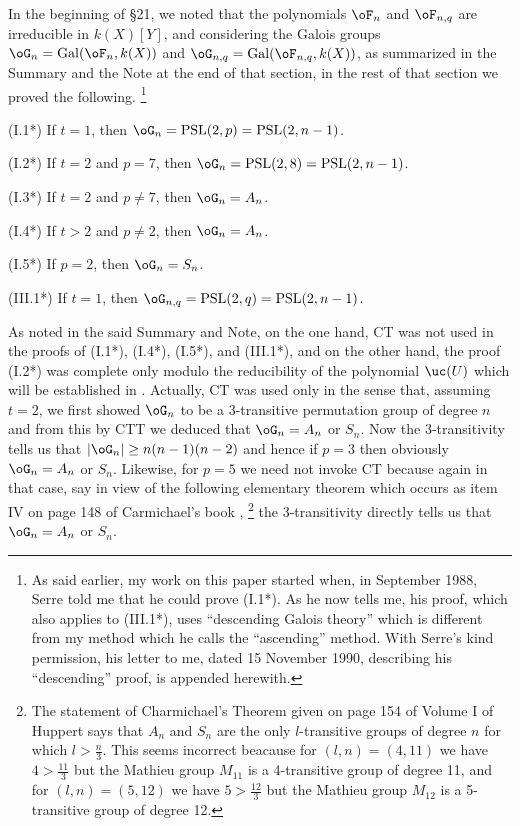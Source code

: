 In the beginning of \S21, we noted that
the polynomials $\oF_{n}$ and $\oF_{n,q}$ are irreducible 
in $k(X)[Y]$, and
considering the Galois groups 
$\oG_{n}=\operatorname{Gal}(\oF_{n},k(X))$ and
$\oG_{n,q} =\operatorname{Gal}(\oF_{n,q},k(X))$, as 
summarized in the Summary and the 
Note at the end of that section, in the rest of that 
section we 
proved the following.
\footnote{As said earlier, my work on this paper started 
when, in September
1988, Serre told me that he could prove (I.1*). As he now 
tells me, his
proof, which also applies to (III.1*), uses ``descending 
Galois theory''
which is different from my method which he calls the 
``ascending''
method.
With Serre's kind permission,
his letter to me,
dated 15 November 1990,
describing his ``descending''
proof, is appended herewith.}

(I.1*) If $t=1$, then $\oG_n=\operatorname{PSL}(2,p)=%
\operatorname{PSL}(2,n-1)$.

(I.2*) If $t=2$ and $p=7$, then $\oG_n=%
\operatorname{PSL}(2,8)=\operatorname{PSL}(2,n-1)$.

(I.3*) If $t=2$ and $p\neq 7$, then $\oG_n=A_n$.

(I.4*) If $t>2$ and $p\neq 2$, then $\oG_n=A_n$.

(I.5*) If $p=2$, then $\oG_n=S_n$.

(III.1*) If $t=1$, then $\oG_{n,q}=%
\operatorname{PSL}(2,q)=\operatorname{PSL}(2,n-1)$.

As noted in the said Summary and Note, on the one hand, 
CT was not used in the proofs of (I.1*), (I.4*), (I.5*), 
and (III.1*), and 
on the other hand, the proof (I.2*) was complete only 
modulo the 
reducibility of the polynomial $\uc(U)$ which will be 
established in
\cite{A7}. 
Actually, CT was used only in the sense that, assuming 
$t=2$, we first 
showed $\oG_n$ to be a $3$-transitive permutation group of
degree $n$ and from this by CTT we deduced that 
$\oG_n=A_n$ or $S_n$.
Now the $3$-transitivity tells us that $|\oG_n|\ge 
n(n-1)(n-2)$ and
hence if $p=3$ then obviously $\oG_n=A_n$ or $S_n$. 
Likewise, for $p=5$
we need not invoke CT because again in that case, say in 
view of the following
elementary theorem which occurs as item IV on page 148 of 
Carmichael's
book \cite{Ca}, 
\footnote{The statement of Charmichael's Theorem given on 
page 154 of Volume I 
of Huppert \cite{HB} says that $A_n$ and $S_n$ are the 
only $l$-transitive 
groups of degree $n$ for which $l>\frac n3$. This seems 
incorrect beacause
for $(l,n)=(4,11)$ we have $4>\frac{11}{3}$ but the 
Mathieu group $M_{11}$ 
is a 4-transitive group of degree 11, and for 
$(l,n)=(5,12)$ 
we have $5>\frac{12}{3}$ but the Mathieu group $M_{12}$ is 
a 
5-transitive group of degree 12.}
the $3$-transitivity directly tells us that
$\oG_n=A_n$ or $S_n$.

